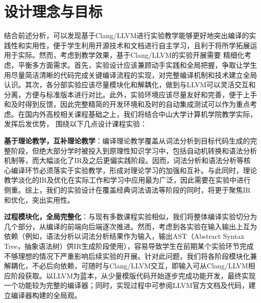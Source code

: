 \documentclass{SCIS2020cn}
\begin{document}
\section{设计理念与目标}
结合前述分析，可以发现基于Clang/LLVM进行实验教学能够更好地突出编译的实践性和实用性，便于学生利用开源技术和文档进行自主学习，且利于将所学拓展运用于实际。然而，考虑到教学效果，基于Clang/LLVM的实验开展需要
精细化考虑，平衡多方面需求。首先，实验设计应该兼顾动手实践和全局把握，争取让学生用尽量简洁清晰的代码完成关键编译流程的实现，对完整编译机制和技术建立全局认识。其次，各分部实验应该尽量模块化和解耦化，做到与LLVM可以灵活交互和分离，方便与标准版本进行对比。此外，实验环境应该尽量友好和完善，便于上手和及时得到反馈，因此完整精简的开发环境和及时的自动集成测试可以作为重点考虑。在国内外高校相关课程基础之上，我们将结合中山大学计算机学院教学实际，发挥后发优势，
围绕以下几点设计课程实验：



\textbf{基于理论教学，互补理论教学}：编译理论教学覆盖从词法分析到目标代码生成的完整阶段，但绝大部分学时被投入到原理性知识学习中，包括自动机转换和语法分析机制等，而大幅淡化了IR及之后更偏实践阶段。因而，词法分析和语法分析等核心编译环节必须落实于实验教学，形成对理论学习的加强和互补。与此同时，理论教学淡化的IR及优化在实际工作和学习中应用最为广泛，因此需要在实验中进行侧重。综上，我们的实验设计在覆盖经典词法语法等阶段的同时，将更于聚焦IR和优化，突出实用性。

\textbf{过程模块化，全局完整化}：与现有多数课程实验相似，我们将整体编译实验切分为几个部分，从编译的前端向后端逐次推进。然而，考虑到各实验在输入输出上互为依赖（例如，语法分析以词法分析结果作为输入，输出AST（Abstract Syntax Tree，抽象语法树）供IR生成阶段使用），容易导致学生在前期某个实验环节完成不够理想的情况下严重影响后续实验的开展。针对此问题，我们将各阶段模块化兼解耦化，不必后向依赖，可随时与Clang/LLVM交互，即输入可从Clang/LLVM相应阶段获取。以LLVM为蓝本，从少量模版代码开始逐步完成功能开发，最终实现一个功能较为完整的编译器；同时，实现过程中可参阅LLVM官方文档及代码，建立编译器构建的全局观。
\end{document}
